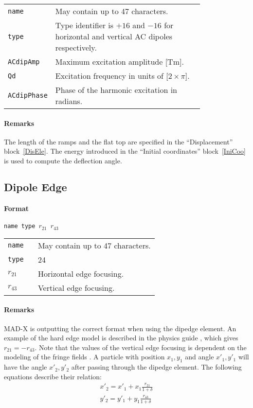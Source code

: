 \bigskip
\begin{tabular}{@{}lp{0.8\linewidth}}
    \texttt{name} & May contain up to 47 characters. \\
    \texttt{type} & Type identifier is $+16$ and $-16$ for horizontal and vertical AC dipoles respectively. \\
    \texttt{ACdipAmp} & Maximum excitation amplitude [Tm]. \\
    \texttt{Qd}   & Excitation frequency in units of [$2 \times \pi$]. \\
    \texttt{ACdipPhase} & Phase of the harmonic excitation in radians.
\end{tabular}

\paragraph{Remarks}
The length of the ramps and the flat top are specified in the ``Displacement'' block~\ref{DisEle}. The energy introduced in the ``Initial coordinates'' block~\ref{IniCoo} is used to compute the deflection angle.

\subsection{Dipole Edge}

\paragraph{Format} \texttt{name type $r_{21}$ $r_{43}$}

\bigskip
\begin{tabular}{@{}lp{0.8\linewidth}}
    \texttt{name} & May contain up to 47 characters. \\
    \texttt{type} & 24 \\
    \texttt{$r_{21}$} & Horizontal edge focusing. \\
    \texttt{$r_{43}$} & Vertical edge focusing.
\end{tabular}
    
\paragraph{Remarks}
MAD-X is outputting the correct format when using the dipedge element. An example of  the hard edge model is described in the physics guide \cite{sixphys}, which gives $r_{21} = -r_{43}$.
Note that the values of the vertical edge focusing is dependent on the modeling of the fringe fields \cite{dipedge}.
A particle with position $x_{1},y_1$ and angle $x'_{1},y'_1$ will have the angle $x'_{2},y'_2$ after passing through the dipedge element.
The following equations describe their relation:
\begin{eqnarray}
    x'_{2} = x'_{1} + x_{1}\frac{r_{21}}{1+\delta} \\
    y'_{2} = y'_{1} + y_{1}\frac{r_{43}}{1+\delta}
\end{eqnarray}

